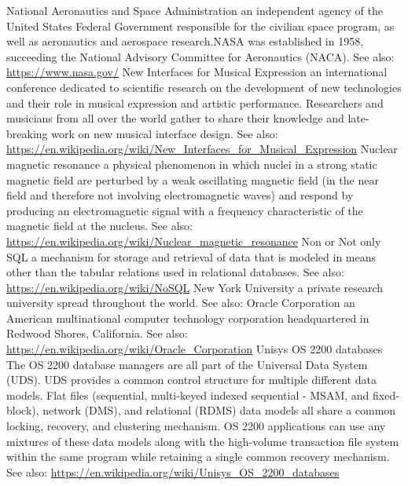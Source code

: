 	{National Aeronautics and Space Administration}
	{an independent agency of the United States Federal Government responsible for the civilian space program, as well as aeronautics and aerospace research.NASA was established in 1958, succeeding the National Advisory Committee for Aeronautics (NACA). See also: \url{https://www.nasa.gov/}}
	{New Interfaces for Musical Expression}
	{an international conference dedicated to scientific research on the development of new technologies and their role in musical expression and artistic performance. Researchers and musicians from all over the world gather to share their knowledge and late-breaking work on new musical interface design. See also: \url{https://en.wikipedia.org/wiki/New_Interfaces_for_Musical_Expression}}
	{Nuclear magnetic resonance}
	{a physical phenomenon in which nuclei in a strong static magnetic field are perturbed by a weak oscillating magnetic field (in the near field and therefore not involving electromagnetic waves) and respond by producing an electromagnetic signal with a frequency characteristic of the magnetic field at the nucleus. See also: \url{https://en.wikipedia.org/wiki/Nuclear_magnetic_resonance}}
	{Non or Not only SQL}
	{a mechanism for storage and retrieval of data that is modeled in means other than the tabular relations used in relational databases. See also: \url{https://en.wikipedia.org/wiki/NoSQL}}
	{New York University}
	{a private research university spread throughout the world. See also: \url{}}
	{Oracle Corporation}
	{an American multinational computer technology corporation headquartered in Redwood Shores, California.  See also: \url{https://en.wikipedia.org/wiki/Oracle_Corporation}}
	{Unisys OS 2200 databases}
	{The OS 2200 database managers are all part of the Universal Data System (UDS). UDS provides a common control structure for multiple different data models. Flat files (sequential, multi-keyed indexed sequential - MSAM, and fixed-block), network (DMS), and relational (RDMS) data models all share a common locking, recovery, and clustering mechanism. OS 2200 applications can use any mixtures of these data models along with the high-volume transaction file system within the same program while retaining a single common recovery mechanism. See also: \url{https://en.wikipedia.org/wiki/Unisys_OS_2200_databases}}
